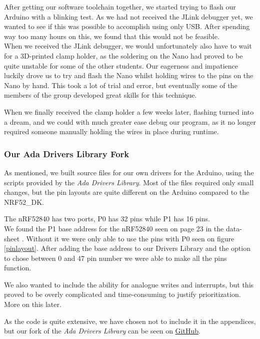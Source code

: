 \documentclass{article}
\begin{document}
After getting our software toolchain together, we started trying to flash our Arduino with a blinking test. As we had not received the JLink debugger yet, we wanted to see if this was possible to accomplish using only USB. After spending way too many hours on this, we found that this would not be feasible.\\

When we received the JLink debugger, we would unfortunately also have to wait for a 3D-printed clamp holder, as the soldering on the Nano had proved to be quite unstable for some of the other students. Our eagerness and impatience luckily drove us to try and flash the Nano whilst holding wires to the pins on the Nano by hand. This took a lot of trial and error, but eventually some of the members of the group developed great skills for this technique.

When we finally received the clamp holder a few weeks later, flashing turned into a dream, and we could with much greater ease debug our program, as it no longer required someone manually holding the wires in place during runtime.


\subsubsection{Our Ada Drivers Library Fork}

As mentioned, we built source files for our own drivers for the Arduino, using the scripts provided by the \textit{Ada Drivers Library}. Most of the files required only small changes, but the pin layouts are quite different on the Arduino compared to the NRF52\_DK.

The nRF52840 has two ports, P0 has 32 pins while P1 has 16 pins.\\
We found the P1 base address for the nRF52840 seen on page 23 in the data-sheet \cite{NRF52840}. Without it we were only able to use the pins with P0 seen on figure \ref{pinlayout}. After adding the base address to our Drivers Library and the option to chose between 0 and 47 pin number we were able to make all the pins function.

We also wanted to include the ability for analogue writes and interrupts, but this proved to be overly complicated and time-consuming to justify prioritization. More on this later.

As the code is quite extensive, we have chosen not to include it in the appendices, but our fork of the \textit{Ada Drivers Library} can be seen on \href{https://github.com/Stykk-Gruppen/Ada_Drivers_Library}{GitHub}.
\end{document}
